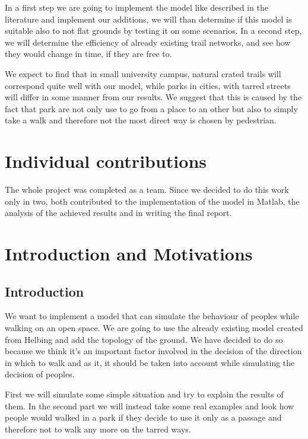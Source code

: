 \documentclass[11pt]{article}
\begin{document}
In a first step we are going to implement the model like described in the literature and implement our additions, we will than determine if this model is suitable also to not flat grounds by testing it on some scenarios. 
In a second step, we will determine the efficiency of already existing trail networks, and see how they would change in time, if they are free to. 

We expect to find that in small university campus, natural crated trails will correspond quite well with our model, while parks in cities, with tarred streets will differ in some manner from our results. We suggest that this is caused by the fact that park are not only use to go from a place to an other but also to simply take a walk and therefore not the most direct way is chosen by pedestrian.

\section{Individual contributions}

The whole project was completed as a team. Since we decided to do this work only in two, both contributed to the implementation of the model in Matlab, the analysis of the achieved results and in writing the final report.

\newpage 
 
\section{Introduction and Motivations}

\subsection{Introduction}

We want to implement a model that can simulate the behaviour of peoples while walking on an open space. We are going to use the already existing model created from Helbing and add the topology of the ground. We have decided to do so because we think it's an important factor involved in the decision of the direction in which to walk and as it, it should be taken into account while simulating the decision of peoples.  

First we will simulate some simple situation and try to explain the results of them. In the second part we will instead take some real examples and look how people would walked in a park if they decide to use it only as a passage and therefore not to walk any more on the tarred ways.
\end{document}
